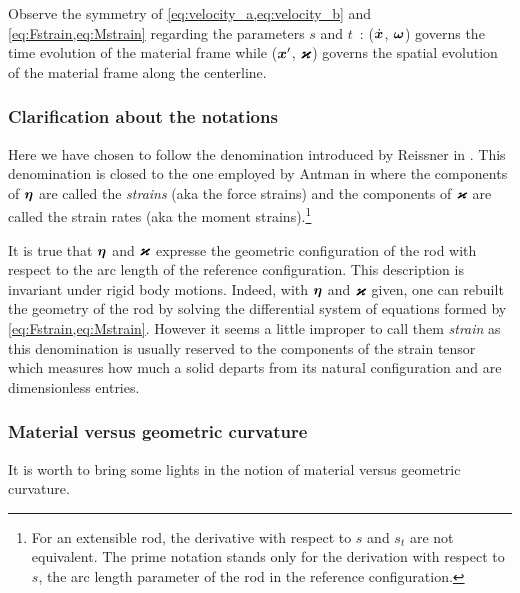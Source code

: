 Observe the symmetry of \cref{eq:velocity_a,eq:velocity_b} and \cref{eq:Fstrain,eq:Mstrain} regarding the parameters $s$ and $t$~: ($\dot{\boldsymbol{x}}$, $\boldsymbol{\omega}$) governs the time evolution of the material frame while ($\boldsymbol{x}'$, $\boldsymbol{\varkappa}$) governs the spatial evolution of the material frame along the centerline.

\subsubsection{Clarification about the notations}
Here we have chosen to follow the denomination introduced by Reissner in \cite{Reissner1973}. This denomination is closed to the one employed by Antman in \cite[p.~284]{Antman2005} where the components of $\boldsymbol{\eta}$ are called the \emph{strains} (aka the force strains) and the components of $\boldsymbol{\varkappa}$ are called the strain rates (aka the moment strains).\footnote{For an extensible rod, the derivative with respect to $s$ and $s_t$ are not equivalent. The prime notation stands only for the derivation with respect to $s$, the arc length parameter of the rod in the reference configuration.}

It is true that $\boldsymbol{\eta}$ and $\boldsymbol{\varkappa}$ expresse the geometric configuration of the rod with respect to the arc length of the reference configuration. This description is invariant under rigid body motions. Indeed, with $\boldsymbol{\eta}$ and $\boldsymbol{\varkappa}$ given, one can rebuilt the geometry of the rod by solving the differential system of equations formed by \cref{eq:Fstrain,eq:Mstrain}. However it seems a little improper to call them \emph{strain} as this denomination is usually reserved to the components of the strain tensor which measures how much a solid departs from its natural configuration and are dimensionless entries.

\subsubsection{Material versus geometric curvature}

It is worth to bring some lights in the notion of material versus geometric curvature.

